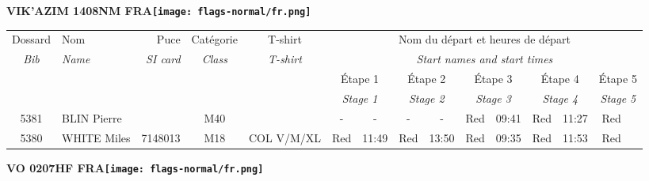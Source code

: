 \documentclass{report}
\begin{document}
\newpage
  \Huge \centering \bfseries VIK'AZIM 1408NM FRA\normalfont \footnotesize \sffamily \hfill \texttt{[image: flags-normal/fr.png]} \newline 
  \begin{longtable}{|c|l|r|c|c|*{5}{cc|}}
    Dossard & Nom  & Puce    & Catégorie & T-shirt & \multicolumn{10}{c|}{Nom du départ et heures de départ} \\
    \itshape Bib     & \itshape Name & \itshape SI card & \itshape Class  & \itshape  T-shirt  & \multicolumn{10}{c|}{\itshape Start names and start times} \\
    \hline
    & & & & & \multicolumn{2}{c|}{Étape 1} & \multicolumn{2}{c|}{Étape 2} & \multicolumn{2}{c|}{Étape 3} & \multicolumn{2}{c|}{Étape 4} & \multicolumn{2}{c|}{Étape 5} \\
    & & & & & \multicolumn{2}{c|}{\itshape Stage 1} & \multicolumn{2}{c|}{\itshape Stage 2} & \multicolumn{2}{c|}{\itshape Stage 3} & \multicolumn{2}{c|}{\itshape Stage 4} & \multicolumn{2}{c|}{\itshape Stage 5} \\
    \hline
    5381 & BLIN Pierre &  & M40 &   & - &  - & - &  - & Red & 09:41 & Red & 11:27 & Red &  \\
    5380 & WHITE Miles & 7148013 & M18 & COL V/M/XL & Red & 11:49 & Red & 13:50 & Red & 09:35 & Red & 11:53 & Red &  \\
  \end{longtable}
\newpage
  \Huge \centering \bfseries VO 0207HF FRA\normalfont \footnotesize \sffamily \hfill \texttt{[image: flags-normal/fr.png]} \newline 
\end{document}
